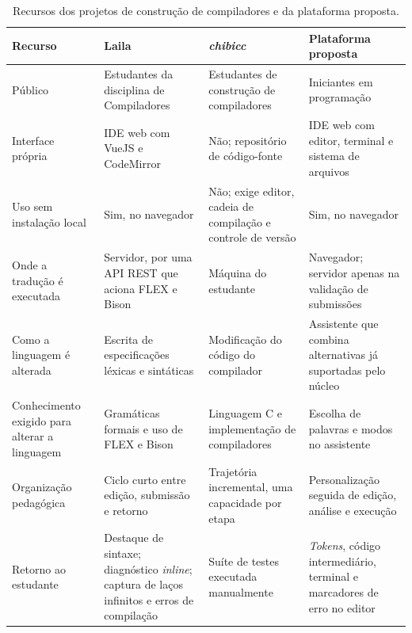 \begin{table}[htbp]
\centering
\caption{Recursos dos projetos de construção de compiladores e da plataforma proposta.}
\label{tab:comparativo-compiladores}
\footnotesize
\setlength{\tabcolsep}{3pt}
\renewcommand{\arraystretch}{1.15}
\begin{tabular}{|>{\raggedright\arraybackslash}p{}|>{\raggedright\arraybackslash}p{}|>{\raggedright\arraybackslash}p{}|>{\raggedright\arraybackslash}p{}|}
\hline
\textbf{Recurso} & \textbf{Laila} & \textbf{\textit{chibicc}} & \textbf{Plataforma proposta} \\
\hline
Público & Estudantes da disciplina de Compiladores & Estudantes de construção de compiladores & Iniciantes em programação \\
\hline
Interface própria & IDE web com VueJS e CodeMirror & Não; repositório de código-fonte & IDE web com editor, terminal e sistema de arquivos \\
\hline
Uso sem instalação local & Sim, no navegador & Não; exige editor, cadeia de compilação e controle de versão & Sim, no navegador \\
\hline
Onde a tradução é executada & Servidor, por uma API REST que aciona FLEX e Bison & Máquina do estudante & Navegador; servidor apenas na validação de submissões \\
\hline
Como a linguagem é alterada & Escrita de especificações léxicas e sintáticas & Modificação do código do compilador & Assistente que combina alternativas já suportadas pelo núcleo \\
\hline
Conhecimento exigido para alterar a linguagem & Gramáticas formais e uso de FLEX e Bison & Linguagem C e implementação de compiladores & Escolha de palavras e modos no assistente \\
\hline
Organização pedagógica & Ciclo curto entre edição, submissão e retorno & Trajetória incremental, uma capacidade por etapa & Personalização seguida de edição, análise e execução \\
\hline
Retorno ao estudante & Destaque de sintaxe; diagnóstico \textit{inline}; captura de laços infinitos e erros de compilação & Suíte de testes executada manualmente & \textit{Tokens}, código intermediário, terminal e marcadores de erro no editor \\
\hline
\end{tabular}
\end{table}

